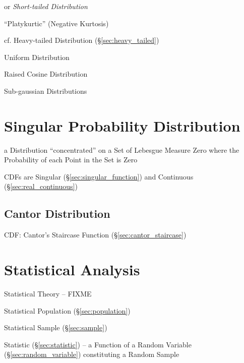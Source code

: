 or \emph{Short-tailed Distribution}

``Platykurtic'' (Negative Kurtosis)

cf. Heavy-tailed Distribution (\S\ref{sec:heavy_tailed})

Uniform Distribution

Raised Cosine Distribution

Sub-gaussian Distributions



\section{Singular Probability Distribution}\label{sec:singular_distribution}

a Distribution ``concentrated'' on a Set of Lebesgue Measure Zero where
the Probability of each Point in the Set is Zero

CDFs are Singular (\S\ref{sec:singular_function}) and Continuous
(\S\ref{sec:real_continuous})



\subsection{Cantor Distribution}\label{sec:cantor_distribution}

CDF: Cantor's Staircase Function (\S\ref{sec:cantor_staircase})



\section{Statistical Analysis}\label{sec:statistical_analysis}

Statistical Theory -- FIXME

Statistical Population (\S\ref{sec:population})

Statistical Sample (\S\ref{sec:sample})

Statistic (\S\ref{sec:statistic}) -- a Function of a Random Variable
(\S\ref{sec:random_variable}) constituting a Random Sample

